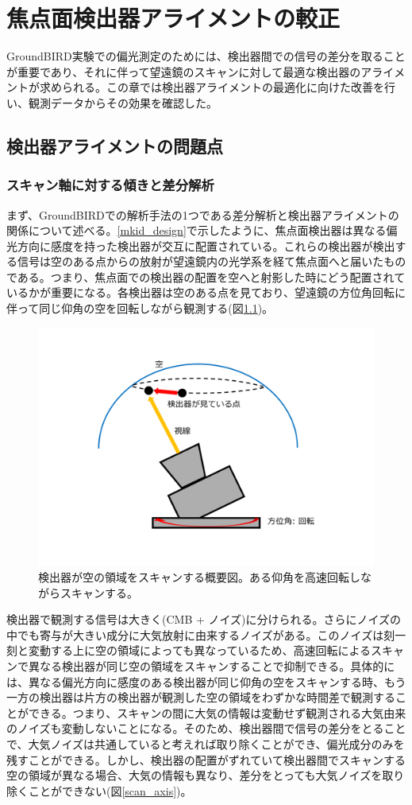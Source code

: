 \chapter{焦点面検出器アライメントの較正}
\label{chapter4}

GroundBIRD実験での偏光測定のためには、検出器間での信号の差分を取ることが重要であり、それに伴って望遠鏡のスキャンに対して最適な検出器のアライメントが求められる。この章では検出器アライメントの最適化に向けた改善を行い、観測データからその効果を確認した。

\section{検出器アライメントの問題点}

\subsection{スキャン軸に対する傾きと差分解析}
まず、GroundBIRDでの解析手法の1つである差分解析と検出器アライメントの関係について述べる。\ref{mkid_design}で示したように、焦点面検出器は異なる偏光方向に感度を持った検出器が交互に配置されている。これらの検出器が検出する信号は空のある点からの放射が望遠鏡内の光学系を経て焦点面へと届いたものである。つまり、焦点面での検出器の配置を空へと射影した時にどう配置されているかが重要になる。各検出器は空のある点を見ており、望遠鏡の方位角回転に伴って同じ仰角の空を回転しながら観測する(図\ref{scan_image})。
\begin{figure}[htbp]
  \centering
  \includegraphics[width=0.6\columnwidth]{5_alignment/figs/scan_image.pdf}
  \caption{検出器が空の領域をスキャンする概要図。ある仰角を高速回転しながらスキャンする。}
  \label{scan_image}
\end{figure}
検出器で観測する信号は大きく(CMB + ノイズ)に分けられる。さらにノイズの中でも寄与が大きい成分に大気放射に由来するノイズがある。このノイズは刻一刻と変動する上に空の領域によっても異なっているため、高速回転によるスキャンで異なる検出器が同じ空の領域をスキャンすることで抑制できる。具体的には、異なる偏光方向に感度のある検出器が同じ仰角の空をスキャンする時、もう一方の検出器は片方の検出器が観測した空の領域をわずかな時間差で観測することができる。つまり、スキャンの間に大気の情報は変動せず観測される大気由来のノイズも変動しないことになる。そのため、検出器間で信号の差分をとることで、大気ノイズは共通していると考えれば取り除くことができ、偏光成分のみを残すことができる。しかし、検出器の配置がずれていて検出器間でスキャンする空の領域が異なる場合、大気の情報も異なり、差分をとっても大気ノイズを取り除くことができない(図\ref{scan_axis})。
